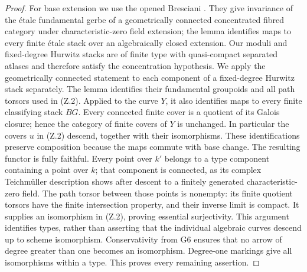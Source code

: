 \begin{proof}
For base extension we use the opened Bresciani
\cite[Lemma A.22 and Proposition A.23]{G_Bresciani2021}. They give
invariance of the \'etale fundamental gerbe of a geometrically connected
concentrated fibred category under characteristic-zero field extension;
the lemma identifies maps to every finite \'etale stack over an
algebraically closed extension. Our moduli and fixed-degree Hurwitz
stacks are of finite type with quasi-compact separated atlases and
therefore satisfy the concentration hypothesis. We apply the
geometrically connected statement to each component of a fixed-degree
Hurwitz stack separately. The lemma identifies
their fundamental groupoids and all path torsors used in (Z.2).
Applied to the curve $Y$, it also identifies maps to every finite
classifying stack $BG$. Every connected finite cover is a quotient
of its Galois closure; hence the category of finite covers of $Y$
is unchanged. In particular the covers $u$ in (Z.2) descend, together
with their isomorphisms. These identifications preserve composition because the maps commute with
base change. The resulting functor is fully faithful. Every point
over $k'$ belongs to a type component containing a point over $k$;
that component is connected, as its complex Teichm\"uller description
shows after descent to a finitely generated characteristic-zero field.
The path torsor between those points is nonempty: its finite quotient
torsors have the finite intersection property, and their inverse
limit is compact. It supplies an isomorphism in (Z.2), proving essential
surjectivity. This argument identifies types, rather than asserting
that the individual algebraic curves descend up to scheme isomorphism.
Conservativity from G6 ensures that no arrow of degree greater than
one becomes an isomorphism. Degree-one markings give all isomorphisms
within a type. This proves every remaining assertion.
\end{proof}

